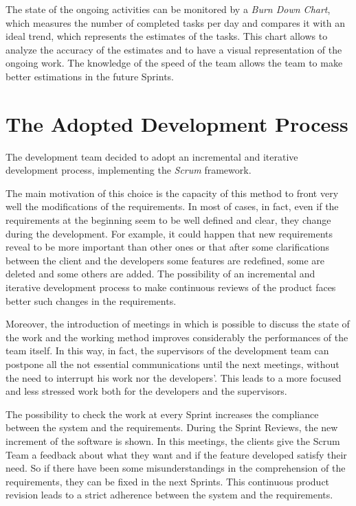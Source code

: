 			The state of the ongoing activities can be monitored by a \emph{Burn Down Chart}, which measures the number of completed tasks per day and compares it with an ideal trend, which represents the estimates of the tasks. This chart allows to analyze the accuracy of the estimates and to have a visual representation of the ongoing work. 
			The knowledge of the speed of the team allows the team to make better estimations in the future Sprints.

					
			
	
	
	\section{The Adopted Development Process}
		The development team decided to adopt an incremental and iterative development process, implementing the \emph{Scrum} framework. 

		The main motivation of this choice is the capacity of this method to front very well the modifications of the requirements. 
		In most of cases, in fact, even if the requirements at the beginning seem to be well defined and clear, they change during the development. For example, it could happen that new requirements reveal to be more important than other ones or that after some clarifications between the client and the developers some features are redefined, some are deleted and some others are added. The possibility of an incremental and iterative development process to make continuous reviews of the product faces better such changes in the requirements. 

		Moreover, the introduction of meetings in which is possible to discuss the state of the work and the working method improves considerably the performances of the team itself. In this way, in fact, the supervisors of the development team can postpone all the not essential communications until the next meetings, without the need to interrupt his work nor the developers'. This leads to a more focused and less stressed work both for the developers and the supervisors.

		The possibility to check the work at every Sprint increases the compliance between the system and the requirements. During the Sprint Reviews, the new increment of the software is shown. In this meetings, the clients give the Scrum Team a feedback about what they want and if the feature developed satisfy their need. So if there have been some misunderstandings in the comprehension of the requirements, they can be fixed in the next Sprints. This continuous product revision leads to a strict adherence between the system and the requirements.

